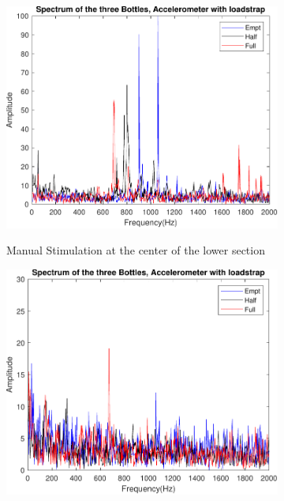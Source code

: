\begin{figure}[]
    \centering
    \begin{subfigure}{0.45\textwidth}
        \centering
        \includegraphics[width=\linewidth]{Chapters/6CHP/Figures/ResultsSensors/AcCiMaBot.pdf}
        \caption{Manual Stimulation at the center of the lower section}{}
        \label{subfig:ResAcCiMaBot}
    \end{subfigure}
    \begin{subfigure}{0.45\textwidth}
        \centering
        \includegraphics[width=\linewidth]{Chapters/6CHP/Figures/ResultsSensors/AcCiAuBot.pdf}

\end{subfigure}
\end{figure}
